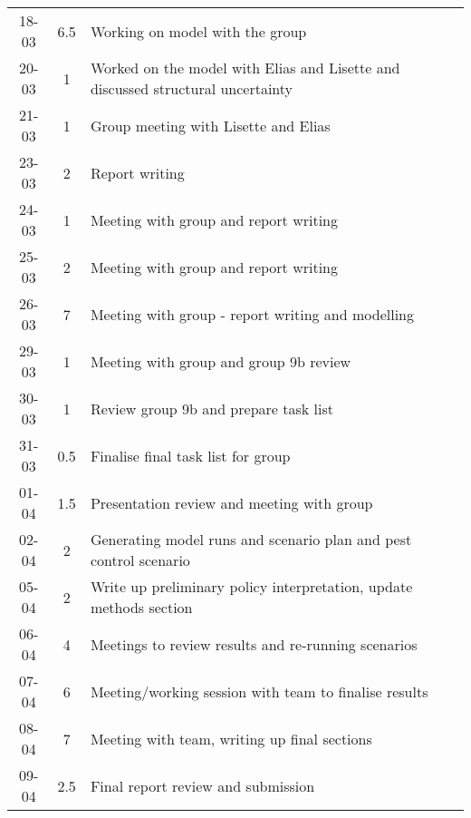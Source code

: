 \begin{longtable}[c]{c|c|m{35em}}
 18-03 & 6.5  & Working on model with the group \\
 20-03 & 1 & Worked on the model with Elias and Lisette and discussed structural uncertainty \\
 21-03 & 1 & Group meeting with Lisette and Elias\\
 23-03 & 2 & Report writing\\
 24-03 & 1 & Meeting with group and report writing\\
 25-03 & 2 & Meeting with group and report writing\\
 26-03 & 7 & Meeting with group - report writing and modelling\\
 29-03 & 1 & Meeting with group and group 9b review\\
 30-03 & 1 & Review group 9b and prepare task list\\
 31-03 & 0.5 & Finalise final task list for group\\
 01-04 & 1.5 & Presentation review and meeting with group\\
 02-04 & 2 & Generating model runs and scenario plan and pest control scenario\\
 05-04 & 2 & Write up preliminary policy interpretation, update methods section\\
 06-04 & 4 & Meetings to review results and re-running scenarios\\
 07-04 & 6 & Meeting/working session with team to finalise results\\
 08-04 & 7 & Meeting with team, writing up final sections\\
 09-04 & 2.5 & Final report review and submission
 

\end{longtable}

